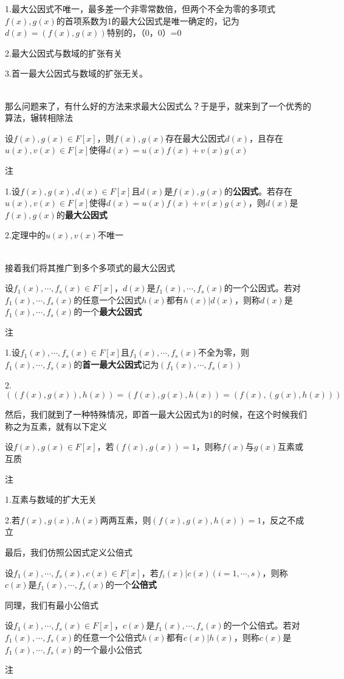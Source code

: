 \documentclass[lang=cn,10pt]{elegantbook}
\begin{document}
1.最大公因式不唯一，最多差一个非零常数倍，但两个不全为零的多项式$f(x),g(x)$的首项系数为1的最大公因式是唯一确定的，记为$d(x)=(f(x),g(x))$特别的，（0，0）=0

2.最大公因式与数域的扩张有关

3.首一最大公因式与数域的扩张无关。

~\\

那么问题来了，有什么好的方法来求最大公因式么？于是乎，就来到了一个优秀的算法，辗转相除法
\begin{definition}[辗转相除法]
	设$f(x),g(x)\in F[x]$，则$f(x),g(x)$存在最大公因式$d(x)$，且存在$u(x),v(x)\in F[x]$使得$d(x)=u(x)f(x)+v(x)g(x)$
\end{definition}
注

1.设$f(x),g(x),d(x)\in F[x]$且$d(x)$是$f(x),g(x)$的\textbf{公因式}。若存在$u(x),v(x)\in F[x]$使得$d(x)=u(x)f(x)+v(x)g(x)$，则$d(x)$是$f(x),g(x)$的\textbf{最大公因式}

2.定理中的$u(x),v(x)$不唯一

~\\

接着我们将其推广到多个多项式的最大公因式
\begin{definition}[最大公因式]
	设$f_1(x),\cdots,f_s(x)\in F[x]$，$d(x)$是$f_1(x),\cdots,f_s(x)$的一个公因式。若对$f_1(x),\cdots,f_s(x)$的任意一个公因式$h(x)$都有$h(x)|d(x)$，则称$d(x)$是$f_1(x),\cdots,f_s(x)$的一个\textbf{最大公因式}
\end{definition}
注

1.设$f_1(x),\cdots,f_s(x)\in F[x]$且$f_1(x),\cdots,f_s(x)$不全为零，则$f_1(x),\cdots,f_s(x)$的\textbf{首一最大公因式}记为$(f_1(x),\cdots,f_s(x))$

2.$((f(x),g(x)),h(x))=(f(x),g(x),h(x))=(f(x),(g(x),h(x)))$

然后，我们就到了一种特殊情况，即首一最大公因式为1的时候，在这个时候我们称之为互素，就有以下定义

\begin{definition}[互素]
	设$f(x),g(x)\in F[x]$，若$(f(x),g(x))=1$，则称$f(x)$与$g(x)$互素或互质
\end{definition}
注

1.互素与数域的扩大无关

2.若$f(x),g(x),h(x)$两两互素，则$(f(x),g(x),h(x))=1$，反之不成立

最后，我们仿照公因式定义公倍式
\begin{definition}[公倍式]
	设$f_1(x),\cdots,f_s(x),c(x)\in F[x]$，若$f_i(x)|c(x)(i=1,\cdots,s)$，则称$c(x)$是$f_1(x),\cdots,f_s(x)$的一个\textbf{公倍式}
\end{definition}
同理，我们有最小公倍式
\begin{definition}[最小公倍式]
	设$f_1(x),\cdots,f_s(x)\in F[x]$，$c(x)是f_1(x),\cdots,f_s(x)$的一个公倍式。若对$f_1(x),\cdots,f_s(x)$的任意一个公倍式$h(x)$都有$c(x)|h(x)$，则称$c(x)$是$f_1(x),\cdots,f_s(x)$的一个最小公倍式
\end{definition}
注
\end{document}
